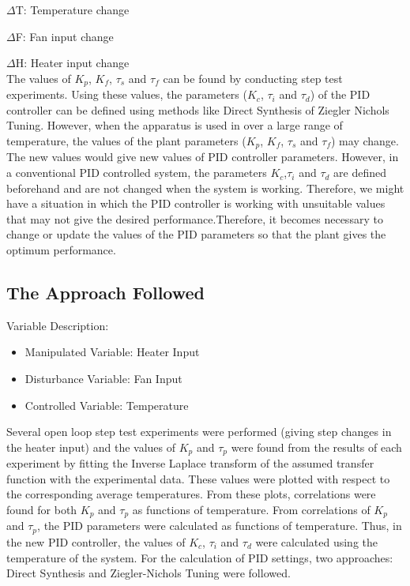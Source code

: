 $\Delta$T: Temperature change

$\Delta$F: Fan input change

$\Delta$H: Heater input change\\

The values of $K_p$, $K_f$, $\tau_s$ and $\tau_f$ can be found by conducting step test experiments. Using these values, 
the parameters ($K_c$,  $\tau_i$ and  $\tau_d$) of the PID controller can be defined using methods like 
Direct Synthesis of Ziegler Nichols Tuning.
However, when the apparatus is used in over a large range of temperature, the values of the plant parameters 
($K_p$, $K_f$, $\tau_s$ and $\tau_f$) may change. The new values would give new values of PID controller parameters. 
However, in a conventional PID controlled system, the parameters $K_c$,$\tau_i$ and $\tau_d$ are defined beforehand and are 
not changed when the system is working. Therefore, we might have a situation in which the PID controller is working with 
unsuitable values that may not give the desired performance.Therefore, it becomes necessary to change or update the values of 
the PID parameters so that the plant gives the optimum performance.
\newpage
\subsection{The Approach Followed}
Variable Description:
\begin{itemize}
	\item  Manipulated Variable: Heater Input
	\item  Disturbance Variable: Fan Input
	\item  Controlled Variable: Temperature
\end{itemize}

Several open loop step test experiments were performed (giving step changes in the heater input) and the values of 
$K_p$ and $\tau_p$  were found from the results of each experiment by fitting the Inverse Laplace transform of the 
assumed transfer function with the experimental data. These values were plotted with respect to the corresponding
average temperatures. From these plots, correlations were found for both $K_p$ and $\tau_p$ as functions of temperature. 
From correlations of $K_p$ and $\tau_p$, the PID parameters were calculated as functions of temperature. Thus, in the 
new PID controller, the values of $K_c$, $\tau_i$ and $\tau_d$ were calculated using the temperature of the system. For 
the calculation of PID settings, two approaches: Direct Synthesis and Ziegler-Nichols Tuning were followed.



